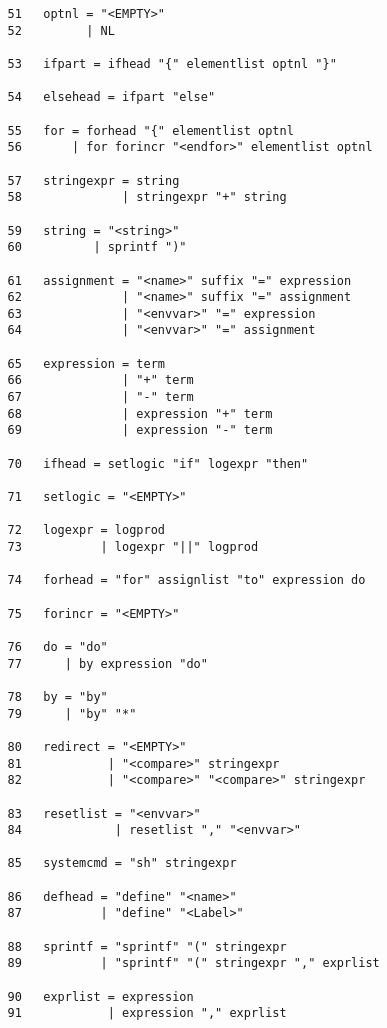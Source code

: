 \documentclass[11pt]{article}
\begin{document}
\begin{verbatim}
   51   optnl = "<EMPTY>" 
   52         | NL 

   53   ifpart = ifhead "{" elementlist optnl "}" 

   54   elsehead = ifpart "else" 

   55   for = forhead "{" elementlist optnl 
   56       | for forincr "<endfor>" elementlist optnl 

   57   stringexpr = string 
   58              | stringexpr "+" string 

   59   string = "<string>" 
   60          | sprintf ")" 

   61   assignment = "<name>" suffix "=" expression 
   62              | "<name>" suffix "=" assignment 
   63              | "<envvar>" "=" expression 
   64              | "<envvar>" "=" assignment 

   65   expression = term 
   66              | "+" term 
   67              | "-" term 
   68              | expression "+" term 
   69              | expression "-" term 

   70   ifhead = setlogic "if" logexpr "then" 

   71   setlogic = "<EMPTY>" 

   72   logexpr = logprod 
   73           | logexpr "||" logprod 

   74   forhead = "for" assignlist "to" expression do 

   75   forincr = "<EMPTY>" 

   76   do = "do" 
   77      | by expression "do" 

   78   by = "by" 
   79      | "by" "*" 

   80   redirect = "<EMPTY>" 
   81            | "<compare>" stringexpr 
   82            | "<compare>" "<compare>" stringexpr 

   83   resetlist = "<envvar>" 
   84             | resetlist "," "<envvar>" 

   85   systemcmd = "sh" stringexpr 

   86   defhead = "define" "<name>" 
   87           | "define" "<Label>" 

   88   sprintf = "sprintf" "(" stringexpr 
   89           | "sprintf" "(" stringexpr "," exprlist 

   90   exprlist = expression 
   91            | expression "," exprlist 


\end{verbatim}
\end{document}
